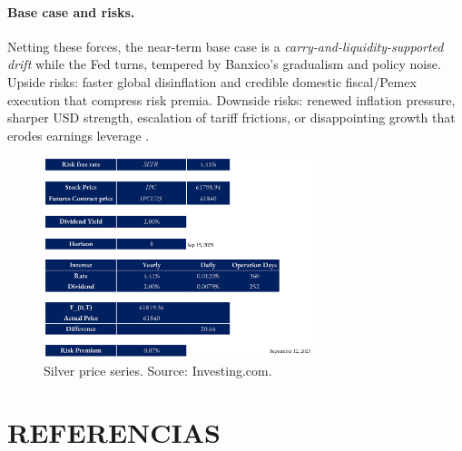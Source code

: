 \documentclass[10pt,a4paper]{article} %
\begin{document}
\paragraph{Base case and risks.}
Netting these forces, the near-term base case is a \emph{carry-and-liquidity-supported drift} while the Fed turns, tempered by Banxico’s gradualism and policy noise. Upside risks: faster global disinflation and credible domestic fiscal/Pemex execution that compress risk premia. Downside risks: renewed inflation pressure, sharper USD strength, escalation of tariff frictions, or disappointing growth that erodes earnings leverage \citep{reuters_ipc_record_2025,bloomberg_mx_inflation_2025,reuters_budget_2025,reuters_pemex_plan_2025,reuters_tariffs_china_autos_2025}.

\begin{figure}[h]
\centering
\includegraphics[width=0.7\textwidth]{figures/ipc.png}
\caption{Silver price series. Source: Investing.com.}
\end{figure}



\section{REFERENCIAS}



\end{document}
